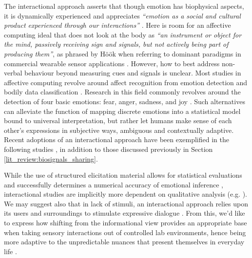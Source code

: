 The interactional approach asserts that though emotion has biophysical aspects, it is dynamically experienced and appreciates \textit{``emotion as a social and cultural product experienced through our interactions''} \cite{boehner_how_2007}. Here is room for an affective computing ideal that does not look at the body as \textit{“an instrument or object for the mind, passively receiving sign and signals, but not actively being part of producing them”}, as phrased by Höök when referring to dominant paradigms in commercial wearable sensor applications \cite{hook_kristina_affective_2012}. However, how to best address non-verbal behaviour beyond measuring cues and signals is unclear. Most studies in affective computing revolve around affect recognition from emotion detection and bodily data classification \cite{bota_review_2019}. Research in this field commonly revolves around the detection of four basic emotions: fear, anger, sadness, and joy \cite{picard_mit_1995}. Such alternatives can alleviate the function of mapping discrete emotions into a statistical model bound to universal interpretation, but rather let humans make sense of each other's expressions in subjective ways, ambiguous and contextually adaptive. Recent adoptions of an interactional approach have been exemplified in the following studies \cite{sanches_ambiguity_2019,umair_thermopixels_2020,fosh_see_2013}, in addition to those discussed previously in Section \ref{lit_review:biosignals_sharing}.

While the use of structured elicitation material allows for statistical evaluations and successfully determines a numerical accuracy of emotional inference \cite{bota_review_2019}, interactional studies are implicitly more dependent on qualitative analysis (e.g. \cite{hook_embracing_2018,howell_life-affirming_2019}). We may suggest also that in lack of stimuli, an interactional approach relies upon its users and surroundings to stimulate expressive dialogue \cite{gonzalez_dance-inspired_2012}. From this, we'd like to express how shifting from the informational view provides an appropriate base when taking sensory interactions out of controlled lab environments, hence being more adaptive to the unpredictable nuances that present themselves in everyday life \cite{brown_into_2011,stjerna_aspects_2013,maki-petaja_aesthetic_2014}.

